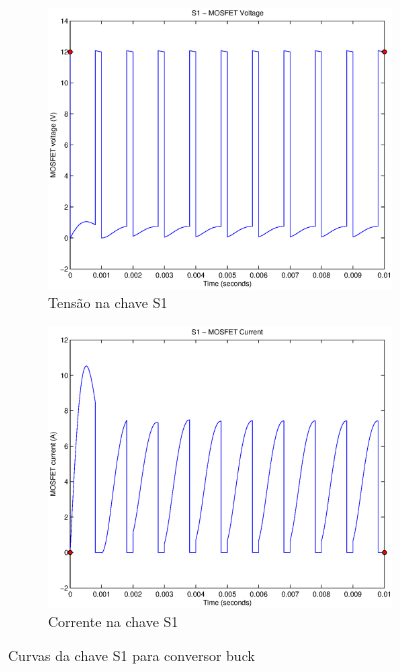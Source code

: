 \documentclass{article}
\begin{document}
\begin{figure}[H]
	\centering
	\begin{subfigure}[b]{0.4\linewidth}
		\includegraphics[width=\linewidth]{matlab/buck/r_s1v}
		\caption{Tensão na chave S1}
	\end{subfigure}
	\begin{subfigure}[b]{0.4\linewidth}
		\centering
		\includegraphics[width=\linewidth]{matlab/buck/r_s1i}
		\caption{Corrente na chave S1}
	\end{subfigure}
	\caption{Curvas da chave S1 para conversor buck}
	\label{fig:bs1}
\end{figure}
\end{document}
